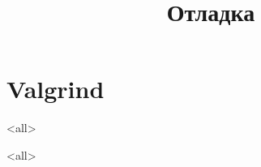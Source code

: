 
\title[Отладка]{Отладка}





\begin{frame}
	\frametitle{}
	\titlepage
	\vspace{-0.5cm}
	\begin{center}
	\end{center}
\end{frame}

\begin{frame}
	\tableofcontents
\end{frame}




\section{Valgrind}
\mode<all>{}

\mode<all>

